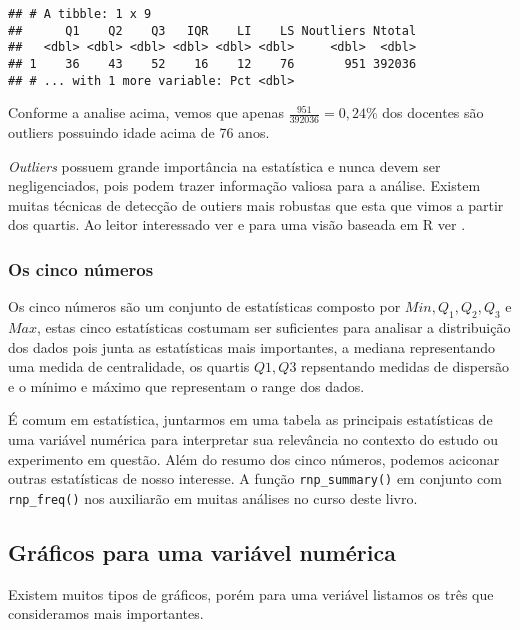 \documentclass[12pt,]{style/krantz}
\renewenvironment{quote}{\begin{VF}}{\end{VF}}
\theoremstyle{definition}
\theoremstyle{definition}
\theoremstyle{definition}
\theoremstyle{remark}
\begin{document}
\begin{verbatim}
## # A tibble: 1 x 9
##      Q1    Q2    Q3   IQR    LI    LS Noutliers Ntotal
##   <dbl> <dbl> <dbl> <dbl> <dbl> <dbl>     <dbl>  <dbl>
## 1    36    43    52    16    12    76       951 392036
## # ... with 1 more variable: Pct <dbl>
\end{verbatim}

Conforme a analise acima, vemos que apenas \(\frac{951}{392036} = 0,24\%\) dos docentes são outliers possuindo idade acima de 76 anos.

\begin{quote}
\emph{Outliers} possuem grande importância na estatística e nunca devem ser negligenciados, pois podem trazer informação valiosa para a análise. Existem muitas técnicas de detecção de outiers mais robustas que esta que vimos a partir dos quartis. Ao leitor interessado ver \citep{barnett1974outliers} e para uma visão baseada em R ver \citep{outliers}.
\end{quote}

\hypertarget{os-cinco-numeros}{%
\subsubsection{Os cinco números}\label{os-cinco-numeros}}

Os cinco números são um conjunto de estatísticas composto por \(Min, Q_1,Q_2,Q_3\) e \(Max\), estas cinco estatísticas costumam ser suficientes para analisar a distribuição dos dados pois junta as estatísticas mais importantes, a mediana representando uma medida de centralidade, os quartis \(Q1,Q3\) repsentando medidas de dispersão e o mínimo e máximo que representam o range dos dados.

É comum em estatística, juntarmos em uma tabela as principais estatísticas de uma variável numérica para interpretar sua relevância no contexto do estudo ou experimento em questão. Além do resumo dos cinco números, podemos aciconar outras estatísticas de nosso interesse. A função \texttt{rnp\_summary()} em conjunto com \texttt{rnp\_freq()} nos auxiliarão em muitas análises no curso deste livro.

\hypertarget{graficos-para-uma-variavel-numerica}{%
\subsection{Gráficos para uma variável numérica}\label{graficos-para-uma-variavel-numerica}}

Existem muitos tipos de gráficos, porém para uma veriável listamos os três que consideramos mais importantes.
\end{document}
